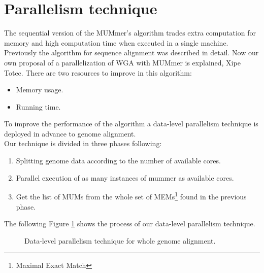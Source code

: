 \documentclass[twocolumn,twoside]{Jornadas}
\begin{document}
\section{Parallelism technique}
The sequential version of the MUMmer's algorithm trades extra computation for memory and high computation time when executed in a single machine. \\
Previously the algorithm for sequence alignment was described in detail. Now our own proposal of a parallelization of WGA with MUMmer is explained, Xipe Totec. There are two resources to improve in this algorithm:
\begin{itemize}
\item Memory usage.
\item Running time.
\end{itemize}
To improve the performance of the algorithm a data-level parallelism technique is deployed in advance to genome alignment.\\
Our technique is divided in three phases following:
\begin{enumerate}
\item Splitting genome data according to the number of available cores.
\item Parallel execution of as many instances of mummer as available cores.
\item Get the list of MUMs from the whole set of MEMs\footnote{Maximal Exact Match} found in the previous phase.
\end{enumerate}
The following Figure \ref{algorithm} shows the process of our data-level parallelism technique.
\begin{figure}[htb] 
\begin{center} 
\end{center} 
\caption{Data-level parallelism technique for whole genome alignment.} 
\label{algorithm} 
\end{figure} 
\end{document}
